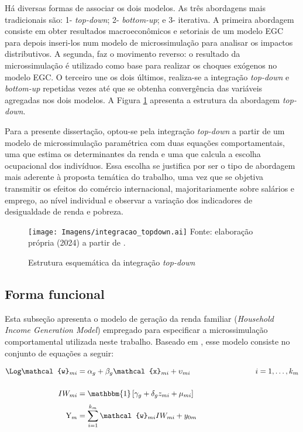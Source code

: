 Há diversas formas de associar os dois modelos. As três abordagens mais tradicionais são: 1- \textit{top-down}; 2- \textit{bottom-up}; e 3- iterativa. A primeira abordagem consiste em obter resultados macroeconômicos e setoriais de um modelo EGC para depois inseri-los num modelo de microssimulação para analisar os impactos distributivos. A segunda, faz o movimento reverso: o resultado da microssimulação é utilizado como base para realizar os choques exógenos no modelo EGC. O terceiro une os dois últimos, realiza-se a integração \textit{top-down} e \textit{bottom-up} repetidas vezes até que se obtenha convergência das variáveis agregadas nos dois modelos. A Figura \ref{fig:microssimulacao} apresenta a estrutura da abordagem \textit{top-down}.

Para a presente dissertação, optou-se pela integração \textit{top-down} a partir de um modelo de microssimulação paramétrica com duas equações comportamentais, uma que estima os determinantes da renda e uma que calcula a escolha ocupacional dos indivíduos. Essa escolha se justifica por ser o tipo de abordagem mais aderente à proposta temática do trabalho, uma vez que se objetiva transmitir os efeitos do comércio internacional, majoritariamente sobre salários e emprego, ao nível individual e observar a variação dos indicadores de desigualdade de renda e pobreza.

\begin{landscape}
	\begin{figure}
		\centering
		\caption{Estrutura esquemática da integração \textit{top-down}} \label{fig:microssimulacao}
		\texttt{[image: Imagens/integracao\_topdown.ai]}
		\footnotesize
		Fonte: elaboração própria (2024) a partir de \textcite{tiberti17}.
	\end{figure}
\end{landscape}


\subsection{Forma funcional} \label{subsec:forma_funcional}

Esta subseção apresenta o modelo de geração da renda familiar (\textit{Household Income Generation Model}) empregado para especificar a microssimulação comportamental utilizada neste trabalho. Baseado em \textcite{bourguignon05}, esse modelo consiste no conjunto de equações a seguir:

\begin{align}
	\Log \mathcal{w}_{mi}  &= \alpha_{g} + \beta_{g} \mathcal{x}_{mi} + \upsilon_{mi} \hspace{3cm} i = 1, \ldots, k_m \label{eq:renda} \\[0.5cm]
	IW_{mi}                &= \mathbbm{1} \left[\gamma_{g} + \delta_{g} z_{mi} + \mu_{mi} \right] \label{eq:ocm} \\[0.1cm]
	\text{Y}_{m}           &= \sum_{i = 1}^{k_{m}} \mathcal{w}_{mi} IW_{mi} + y_{0m} \label{eq:renda_familiar}
\end{align}

